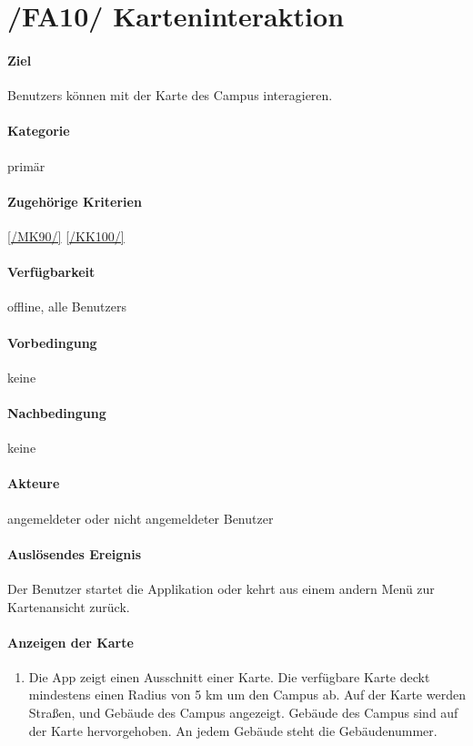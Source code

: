 \section[Karteninteraktion]{/FA10/ Karteninteraktion}
\label{/FA10/}
\paragraph{Ziel}
\Glspl{Benutzer} können mit der \Gls{Karte} des \Gls{Campus} interagieren.
\paragraph{Kategorie}
primär
\paragraph{Zugehörige Kriterien}
\ref{/MK90/} \ref{/KK100/}
\paragraph{Verfügbarkeit}
\gls{offline}, alle \Glspl{Benutzer}
\paragraph{Vorbedingung}
keine
\paragraph{Nachbedingung}
keine
\paragraph{Akteure}
angemeldeter oder nicht angemeldeter \Gls{Benutzer}
\paragraph{Auslösendes Ereignis}
Der \Gls{Benutzer} startet die Applikation oder kehrt aus einem andern Menü zur \Gls{Kartenansicht} zurück.
\paragraph{Anzeigen der Karte}
\begin{enumerate}[start=11, label=\textbf{/FA\arabic*/}, align=left]
    \item Die App zeigt einen Ausschnitt einer \Gls{Karte}. Die verfügbare \Gls{Karte} deckt mindestens einen Radius von 5 km um den \Gls{Campus} ab. Auf der \Gls{Karte} werden Straßen, und Gebäude des \Gls{Campus} angezeigt. Gebäude des \Gls{Campus} sind auf der \Gls{Karte} hervorgehoben. An jedem Gebäude steht die Gebäudenummer.
\end{enumerate}
